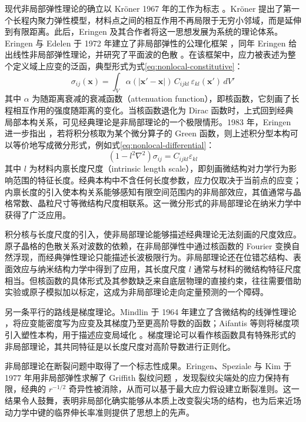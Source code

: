 现代非局部弹性理论的确立以 Kr\"{o}ner 1967 年的工作为标志 \cite{Kroner1967}。Kr\"{o}ner 提出了第一个长程内聚力弹性模型，材料点之间的相互作用不再局限于无穷小邻域，而是延伸到有限距离。此后，Eringen 及其合作者将这一思想发展为系统的理论体系。Eringen 与 Edelen 于 1972 年建立了非局部弹性的公理化框架 \cite{EringenEdelen1972}，同年 Eringen 给出线性非局部弹性理论，并研究了平面波的色散 \cite{Eringen1972}。在该框架中，应力被表述为整个定义域上应变的泛函，典型形式为式\eqref{eq:nonlocal-constitutive}：
\begin{equation}
  \sigma_{ij}(\mathbf{x})=\int_V \alpha(|\mathbf{x}'-\mathbf{x}|)\,C_{ijkl}\,\varepsilon_{kl}(\mathbf{x}')\,dV'
  \label{eq:nonlocal-constitutive}
\end{equation}
其中 $\alpha$ 为随距离衰减的衰减函数（attenuation function），即核函数，它刻画了长程相互作用的强度随距离的变化。当核函数退化为 Dirac 函数时，上式回到经典局部本构关系，可见经典理论是非局部理论的一个极限情形。1983 年，Eringen 进一步指出 \cite{Eringen1983}，若将积分核取为某个微分算子的 Green 函数，则上述积分型本构可以等价地写成微分形式，例如式\eqref{eq:nonlocal-differential}：
\begin{equation}
  (1-l^2\nabla^2)\sigma_{ij}=C_{ijkl}\varepsilon_{kl}
  \label{eq:nonlocal-differential}
\end{equation}
其中 $l$ 为材料内禀长度尺度（intrinsic length scale），即刻画微结构对力学行为影响范围的特征长度。经典本构中不含任何长度参数，应力仅取决于当前点的应变；内禀长度的引入使本构关系能够感知有限空间范围内的非局部效应，其值通常与晶格常数、晶粒尺寸等微结构尺度相联系。这一微分形式的非局部理论在纳米力学中获得了广泛应用。

积分核与长度尺度的引入，使非局部理论能够描述经典理论无法刻画的尺度效应。原子晶格的色散关系对波数的依赖，在非局部弹性中通过核函数的 Fourier 变换自然浮现，而经典弹性理论只能描述长波极限行为。非局部理论还在位错芯结构、表面效应与纳米结构力学中得到了应用，其长度尺度 $l$ 通常与材料的微结构特征尺度相当。但核函数的具体形式及其参数缺乏来自底层物理的直接约束，往往需要借助实验或原子模拟加以标定，这成为非局部理论走向定量预测的一个障碍。

另一条平行的路线是梯度理论。Mindlin 于 1964 年建立了含微结构的线弹性理论 \cite{Mindlin1964}，将应变能密度写为应变及其梯度乃至更高阶导数的函数；Aifantis 等则将梯度项引入塑性本构，用于描述应变局域化 \cite{Aifantis1992}。梯度理论可以看作核函数具有特殊形式的非局部理论，其共同特征是以长度尺度对高阶导数进行正则化。

非局部理论在断裂问题中取得了一个标志性成果。Eringen、Speziale 与 Kim 于 1977 年用非局部弹性求解了 Griffith 裂纹问题 \cite{Eringen1977}，发现裂纹尖端处的应力保持有限，经典的 $r^{-1/2}$ 奇异性被消除，从而可以基于最大应力假设建立断裂准则。这一结果令人鼓舞，表明非局部化确实能够从本质上改变裂尖场的结构，也为后来近场动力学中键的临界伸长率准则提供了思想上的先声。

